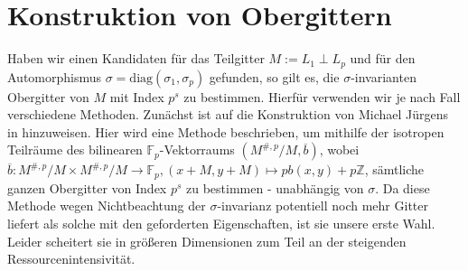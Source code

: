 \documentclass[12pt,a4paper,halfparskip,headsepline,bibtotocnumbered]{scrreprt}
\theoremstyle{nummermitklammern}
\theoremstyle{nonumberbreak}
\newcommand{\Z}{\mathbb{Z}}
\newcommand{\F}{\mathbb{F}}
\begin{document}
\section{Konstruktion von Obergittern}

Haben wir einen Kandidaten für das Teilgitter $M := L_1 \perp L_p$ und für den Automorphismus $\sigma = \text{diag}(\sigma_1, \sigma_p)$ gefunden, so gilt es, die $\sigma$-invarianten Obergitter von $M$ mit Index $p^s$ zu bestimmen. Hierfür verwenden wir je nach Fall verschiedene Methoden. Zunächst ist auf die Konstruktion von Michael Jürgens in \cite[Abschnitt (1.4)]{juergens} hinzuweisen. Hier wird eine Methode beschrieben, um mithilfe der isotropen Teilräume des bilinearen $\F_p$-Vektorraums $(M^{\#,p} / M, \overline{b})$, wobei $\overline{b} : M^{\#,p} / M \times M^{\#,p} / M \rightarrow \F_p, (x+M,y+M) \mapsto pb(x,y) + p\Z$, sämtliche ganzen Obergitter von Index $p^s$ zu bestimmen - unabhängig von $\sigma$. Da diese Methode wegen Nichtbeachtung der $\sigma$-invarianz potentiell noch mehr Gitter liefert als solche mit den geforderten Eigenschaften, ist sie unsere erste Wahl. Leider scheitert sie in größeren Dimensionen zum Teil an der steigenden Ressourcenintensivität.\par
\end{document}
